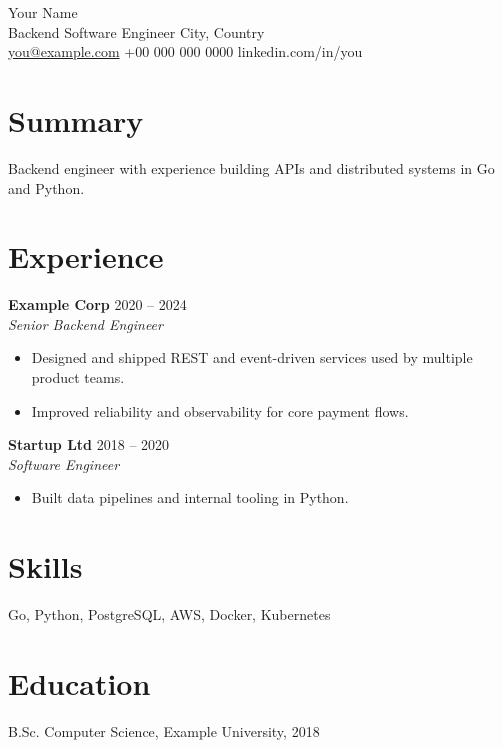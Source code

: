 \documentclass[11pt,a4paper]{article}
\newcommand{\company}[1]{\textbf{#1}}
\newcommand{\position}[1]{\textit{#1}}
\begin{document}
\begin{center}
{\LARGE Your Name}\\[4pt]
Backend Software Engineer \textbar{} City, Country\\
\href{mailto:you@example.com}{you@example.com} \textbar{} +00 000 000 0000 \textbar{} linkedin.com/in/you
\end{center}

\section*{Summary}
Backend engineer with experience building APIs and distributed systems in Go and Python.

\section*{Experience}

\company{Example Corp} \hfill 2020 -- 2024\\
\position{Senior Backend Engineer}
\begin{itemize}
  \item Designed and shipped REST and event-driven services used by multiple product teams.
  \item Improved reliability and observability for core payment flows.
\end{itemize}

\company{Startup Ltd} \hfill 2018 -- 2020\\
\position{Software Engineer}
\begin{itemize}
  \item Built data pipelines and internal tooling in Python.
\end{itemize}

\section*{Skills}
Go, Python, PostgreSQL, AWS, Docker, Kubernetes

\section*{Education}
B.Sc. Computer Science, Example University, 2018
\end{document}
